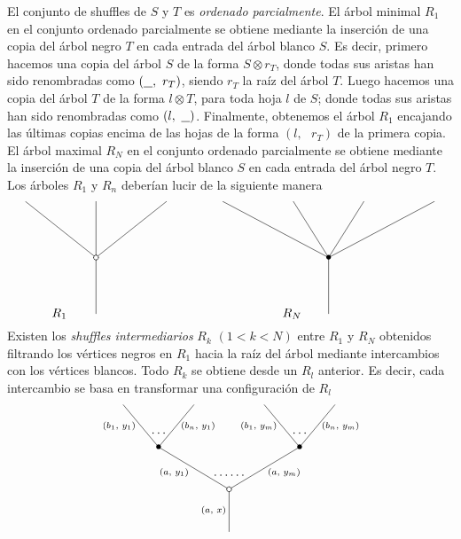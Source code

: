 \documentclass[11pt,a4paper,openright,oneside]{article}
\numberwithin{equation}{section}
\theoremstyle{definition}
\begin{document}
El conjunto de shuffles de $S$ y $T$ es \emph{ordenado parcialmente}. El \'arbol minimal $R_1$ en el conjunto ordenado parcialmente se obtiene mediante la inserci\'on de una copia del \'arbol negro $T$ en cada entrada del \'arbol blanco $S$.
Es decir, primero hacemos una copia del \'arbol $S$ de la forma $S\otimes r_T$, donde todas sus aristas han sido renombradas como $(\underline{\hspace{.25cm}},\text{ }r_T)$, siendo $r_T$ la ra\'iz del \'arbol $T$.
Luego hacemos una copia del \'arbol $T$ de la forma $l\otimes T$, para toda hoja $l$ de $S$; donde todas sus aristas han sido renombradas como $(l,\text{ }\underline{\hspace{.25cm}})$.
Finalmente, obtenemos el \'arbol $R_1$ encajando las \'ultimas copias encima de las hojas de la forma $(l,\text{ }r_T)$ de la primera copia.
El \'arbol maximal $R_N$ en el conjunto ordenado parcialmente se obtiene mediante la inserci\'on de una copia del \'arbol blanco $S$ en cada entrada del \'arbol negro $T$.
Los \'arboles $R_1$ y $R_n$ deber\'ian lucir de la siguiente manera
$$
    \xy
    <0.08cm, 0cm>:
    (0.0, 0.0)*{}="1"; %
    (0.0, 20.0)*\cir<2pt>{}="2"; %
    (-25.0, 40.0)*{}="3"; %
    (0.0, 40.0)*{}="4"; %
    (25.0, 40.0)*{}="5"; %
    "1";"2" **\dir{-};
    "2";"3" **\dir{-};
    "2";"4" **\dir{-};
    "2";"5" **\dir{-};
    (-13,0)*{R_1};
    \endxy
    \xy
    <0.08cm, 0cm>:
    (-10, 0.0)*{}="1";
    (10, 10.0)*{}="2";
    \endxy
    \xy
    <0.08cm, 0cm>:
    (0.0, 0.0)*{}="1"; %
    (0.0, 20.0)*=0{\bullet}="2"; %
    (-37.5, 40.0)*{}="3"; %
    (-12.5, 40.0)*{}="4"; %
    (12.5, 40.0)*{}="5"; %
    (37.5, 40.0)*{}="6"; %
    "1";"2" **\dir{-};
    "2";"3" **\dir{-};
    "2";"4" **\dir{-};
    "2";"5" **\dir{-};
    "2";"6" **\dir{-};
    (-13,0)*{R_N};
    \endxy
$$
Existen los \emph{shuffles intermediarios} $R_k$ $(1 < k < N)$ entre $R_1$ y $R_N$ obtenidos filtrando los v\'ertices negros en $R_1$ hacia la ra\'iz del \'arbol mediante intercambios con los v\'ertices blancos.
Todo $R_k$ se obtiene desde un $R_l$ anterior. Es decir, cada intercambio se basa en transformar una configuraci\'on de $R_l$
\begin{equation}
    \xy
    <0.08cm, 0cm>:
    (0.0, 0.0)*{}="1"; %
    (0.0, 15.0)*\cir<2pt>{}="2"; %
    (-25.0, 30.0)*=0{\bullet}="3"; %
    (-37.5, 45.0)*{}="4"; %
    (-12.5, 45.0)*{}="5"; %
    (25.0, 30.0)*=0{\bullet}="6"; %
    (12.5, 45.0)*{}="7"; %
    (37.5, 45.0)*{}="8"; %
    "1";"2" **\dir{-};
    "2";"3" **\dir{-};
    "3";"4" **\dir{-};
    "3";"5" **\dir{-};
    "2";"6" **\dir{-};
    "6";"7" **\dir{-};
    "6";"8" **\dir{-};
    (-5.5, 7.5)*=0{\scriptstyle (a,\text{ }x)};
    (-19.5, 21)*=0{\scriptstyle (a,\text{ }y_1)};
    (-39, 37.5)*=0{\scriptstyle (b_1,\text{ }y_1)};
    (-11, 37.5)*=0{\scriptstyle (b_n,\text{ }y_1)};
    (19.5, 21)*=0{\scriptstyle (a,\text{ }y_m)};
    (10.5, 37.5)*=0{\scriptstyle (b_1,\text{ }y_m)};
    (39.5, 37.5)*=0{\scriptstyle (b_n,\text{ }y_m)};
    (-25,35)*{\dots};
    (25,35)*{\dots};
    (0,20)*{\dots\dots};
    \endxy
\end{equation}
\end{document}
